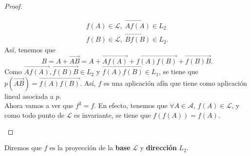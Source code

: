 \begin{proof}
\begin{description}
\[\begin{split}
f\left(A\right) \in \mathcal{L}, \; \overrightarrow{Af\left(A\right)} \in L_{2} \\
f\left(B\right) \in \mathcal{L}, \; \overrightarrow{Bf\left(B\right)} \in L_{2}.
\end{split}
\]
Así, tenemos que 
\[B = A + \overrightarrow{AB} = A + \overrightarrow{Af\left(A\right)} + \overrightarrow{f\left(A\right)f\left(B\right)} + \overrightarrow{f\left(B\right)B} .\]
Como $\displaystyle \overrightarrow{Af\left(A\right)}, \overrightarrow{f\left(B\right)B} \in L_{2} $ y $\displaystyle \overrightarrow{f\left(A\right)f\left(B\right)} \in L_{1} $, se tiene que $\displaystyle p\left(\overrightarrow{AB}\right) = \overrightarrow{f\left(A\right)f\left(B\right)} $. Así, $\displaystyle f $ es una aplicación afín que tiene como aplicación lineal asociada a $\displaystyle p $. \\
Ahora vamos a ver que $\displaystyle f^{2} = f $. En efecto, tenemos que $\displaystyle \forall A \in \mathcal{A} $, $\displaystyle f\left(A\right) \in \mathcal{L} $, y como todo punto de $\displaystyle \mathcal{L} $ es invariante, se tiene que $\displaystyle f\left(f\left(A\right)\right) = f\left(A\right) $.
\end{description}
\end{proof}
\begin{fdefinition}[]
\normalfont Diremos que $\displaystyle f $ es la proyección de la \textbf{base} $\displaystyle \mathcal{L} $ y \textbf{dirección} $\displaystyle L_{2} $.
\end{fdefinition}
